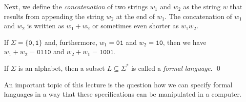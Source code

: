 Next, we define the \emph{concatenation} of two strings $w_1$ and $w_2$ as the string $w$ that
results from appending the string $w_2$ at the end of  $w_1$.  The concatenation of $w_1$ and $w_2$
is written as $w_1 + w_2$ or sometimes even shorter as $w_1w_2$.
\vspace*{0.3cm}

\exampleEng
If $\Sigma = \{\mathtt{0},\mathtt{1}\}$ and, furthermore,  $w_1 = \mathtt{01}$ and $w_2 =
\mathtt{10}$, then we have
\\[0.2cm]
\hspace*{1.3cm}
$w_1+w_2 = \mathtt{0110}$ \quad and \quad $w_2+w_1 = \mathtt{1001}$.  \eox


\begin{Definition} \hspace*{\fill} \linebreak
If $\Sigma$ is an alphabet, then a subset $L \subseteq \Sigma^*$
is called a \emph{formal language}.  \qed
\end{Definition}

An important topic of this lecture is the question how we can specify formal languages in a way that
these specifications can be manipulated in a computer.


